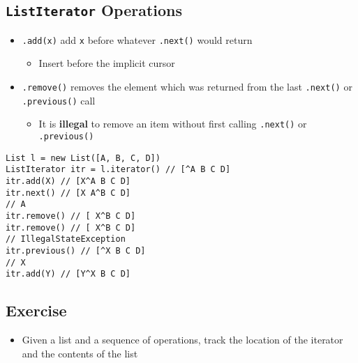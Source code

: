 \documentclass[10pt]{article}
\begin{document}
\subsection*{\texttt{ListIterator} Operations}
\begin{itemize}
    \item \texttt{.add(x)} add \texttt{x} before whatever \texttt{.next()} would return
    \begin{itemize}
        \item Insert before the implicit cursor
    \end{itemize}
    \item \texttt{.remove()} removes the element which was returned from the last \texttt{.next()} or \texttt{.previous()} call
    \begin{itemize}
         \item It is \textbf{illegal} to remove an item without first calling \texttt{.next()} or \texttt{.previous()}
    \end{itemize}
\end{itemize}

\begin{verbatim}
List l = new List([A, B, C, D]) 
ListIterator itr = l.iterator() // [^A B C D]
itr.add(X) // [X^A B C D] 
itr.next() // [X A^B C D]
// A
itr.remove() // [ X^B C D]
itr.remove() // [ X^B C D]
// IllegalStateException
itr.previous() // [^X B C D]
// X
itr.add(Y) // [Y^X B C D]
\end{verbatim}


\subsection*{Exercise}
\begin{itemize}
    \item Given a list and a sequence of operations, track the location of the iterator and the contents of the list
\end{itemize}
\end{document}
